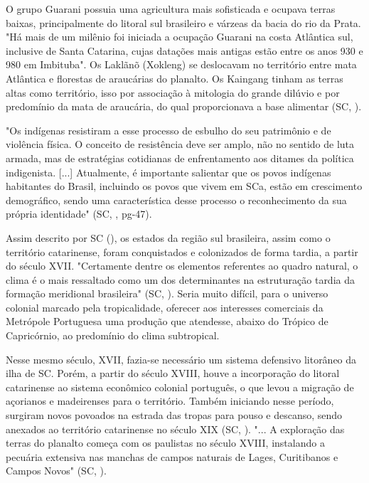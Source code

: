 \indent O grupo Guarani possuia uma agricultura mais sofisticada e ocupava terras baixas, principalmente do litoral sul brasileiro e várzeas da bacia do rio da Prata. "Há mais de um milênio foi iniciada a ocupação Guarani na costa Atlântica sul, inclusive de Santa Catarina, cujas datações mais antigas estão entre os anos 930 e 980 em Imbituba". Os Laklãnõ (Xokleng) se deslocavam no território entre mata Atlântica e florestas de araucárias do planalto. Os Kaingang tinham as terras altas como território, isso por associação à mitologia do grande dilúvio e por predomínio da mata de araucária, do qual proporcionava a base alimentar (\acrlong{SC}, \citeyear{AtlasSCpopulacao}).

\begin{citacao}
"Os indígenas resistiram a esse processo de esbulho do seu patrimônio e de violência
física. O conceito de resistência deve ser amplo, não no sentido de luta armada, mas
de estratégias cotidianas de enfrentamento aos ditames da política indigenista. [...] Atualmente, é importante salientar que os povos indígenas habitantes do Brasil, incluindo os povos que vivem em \acrlong{SC}a, estão em crescimento demográfico, sendo uma característica desse processo o reconhecimento da sua própria identidade" (\acrlong{SC}, \citeyear{AtlasSCpopulacao}, pg-47).
\end{citacao}

\indent Assim descrito por \acrlong{SC} (\citeyear{AtlasSCpopulacao}), os estados da região sul brasileira, assim como o território catarinense, foram conquistados e colonizados de forma tardia, a partir do século XVII. "Certamente dentre os elementos referentes ao quadro natural, o clima é o mais ressaltado como um dos determinantes na estruturação tardia da formação meridional brasileira" (\acrlong{SC}, \citeyear{AtlasSCpopulacao}). Seria muito difícil, para o universo colonial marcado pela tropicalidade, oferecer aos interesses comerciais da Metrópole Portuguesa uma produção que atendesse, abaixo do Trópico de Capricórnio, ao predomínio do clima subtropical.

\indent Nesse mesmo século, XVII, fazia-se necessário um sistema defensivo litorâneo da ilha de \acrlong{SC}. Porém, a partir do século XVIII, houve a incorporação do litoral catarinense ao sistema econômico colonial português, o que levou a migração de açorianos e madeirenses para o território. Também iniciando nesse período, surgiram novos povoados na estrada das tropas para pouso e descanso, sendo anexados ao território catarinense no século XIX (\acrlong{SC}, \citeyear{AtlasSCterritorio}). "... A exploração das terras do planalto começa com os paulistas no século XVIII, instalando a pecuária extensiva nas manchas de campos naturais de Lages, Curitibanos e Campos Novos" (\acrlong{SC}, \citeyear{AtlasSCpopulacao}).

